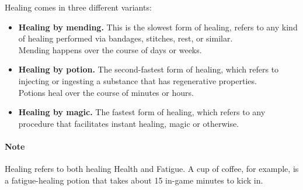 Healing comes in three different variants:

\begin{center}
  \begin{itemize}
  \item \textbf{Healing by mending.}
    This is the slowest form of healing, refers to any kind of healing performed via bandages, stitches, rest, or similar.\\
    Mending happens over the course of days or weeks.
  \item \textbf{Healing by potion.}
    The second-fastest form of healing, which refers to injecting or ingesting a substance that has regenerative properties. \\
    Potions heal over the course of minutes or hours.
  \item \textbf{Healing by magic.}
    The fastest form of healing, which refers to any procedure that facilitates instant healing, magic or otherwise.
  \end{itemize}
\end{center}

\paragraph{Note} Healing refers to both healing Health and Fatigue.
A cup of coffee, for example, is a fatigue-healing potion that takes about 15 in-game minutes to kick in.
